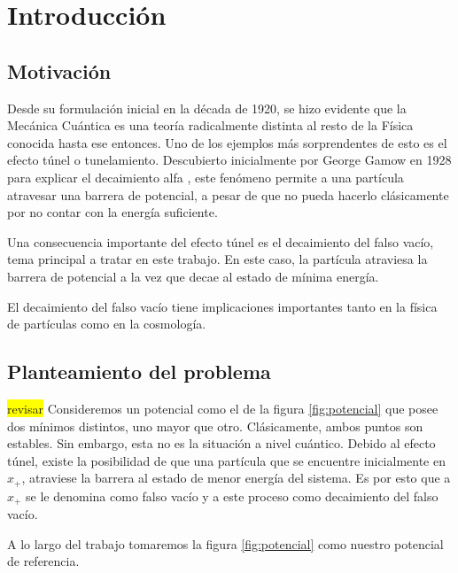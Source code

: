 
\chapter{Introducción} %

\section{Motivación}

Desde su formulación inicial en la década de 1920, se hizo evidente que la Mecánica Cuántica es una teoría radicalmente distinta al resto de la Física conocida hasta ese entonces. Uno de los ejemplos más sorprendentes de esto es el efecto túnel o tunelamiento. Descubierto inicialmente por George Gamow en 1928 para explicar el decaimiento alfa \cite{gamow1928quantum}, este fenómeno permite a una partícula atravesar una barrera de potencial, a pesar de que no pueda hacerlo clásicamente por no contar con la energía suficiente. 

Una consecuencia importante del efecto túnel es el decaimiento del falso vacío, tema principal a tratar en este trabajo. En este caso, la partícula atraviesa la barrera de potencial a la vez que decae al estado de mínima energía. 

El decaimiento del falso vacío tiene implicaciones importantes tanto en la física de partículas como en la cosmología. 


\section{Planteamiento del problema}

\colorbox{yellow}{revisar}
Consideremos un potencial como el de la figura \ref{fig:potencial} que posee dos mínimos distintos, uno mayor que otro. Clásicamente, ambos puntos son estables. Sin embargo, esta no es la situación a nivel cuántico. Debido al efecto túnel, existe la posibilidad de que una partícula que se encuentre inicialmente en $x_+$, atraviese la barrera %
al estado de menor energía del sistema. Es por esto que a $x_+$ se le denomina como falso vacío y a este proceso como decaimiento del falso vacío.

A lo largo del trabajo tomaremos la figura \ref{fig:potencial} como nuestro potencial de referencia. %

